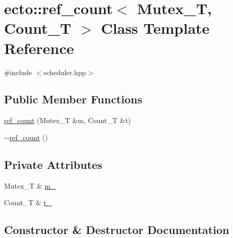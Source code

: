 \hypertarget{classecto_1_1ref__count}{}\section{ecto\+:\+:ref\+\_\+count$<$ Mutex\+\_\+\+T, Count\+\_\+\+T $>$ Class Template Reference}
\label{classecto_1_1ref__count}


{\ttfamily \#include $<$scheduler.\+hpp$>$}

\subsection*{Public Member Functions}
\begin{DoxyCompactItemize}
\item 
\hyperlink{classecto_1_1ref__count_a39fc7e105b142b7444a90dc6a3796828}{ref\+\_\+count} (Mutex\+\_\+\+T \&m, Count\+\_\+\+T \&t)
\item 
\hyperlink{classecto_1_1ref__count_a22b67e2d381344ff4c9b4c453bb47e23}{$\sim$ref\+\_\+count} ()
\end{DoxyCompactItemize}
\subsection*{Private Attributes}
\begin{DoxyCompactItemize}
\item 
Mutex\+\_\+\+T \& \hyperlink{classecto_1_1ref__count_a766db0f4309f593f6c3086a1ebead3a5}{m\+\_\+}
\item 
Count\+\_\+\+T \& \hyperlink{classecto_1_1ref__count_a689842816509f8f13710aee79b8c9898}{t\+\_\+}
\end{DoxyCompactItemize}


\subsection{Constructor \& Destructor Documentation}
\hypertarget{classecto_1_1ref__count_a39fc7e105b142b7444a90dc6a3796828}{}
